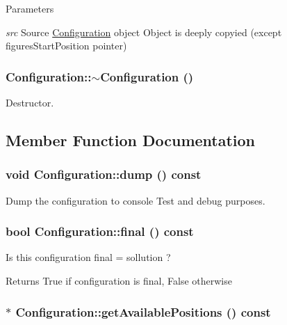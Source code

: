 \begin{DoxyParams}{Parameters}
\item[{\em src}]Source \hyperlink{class_configuration}{Configuration} object Object is deeply copyied (except figuresStartPosition pointer) \end{DoxyParams}
\hypertarget{class_configuration_a0dd0fa189e239f4c9a036303f641441e}{
\subsubsection[{$\sim$Configuration}]{\setlength{\rightskip}{0pt plus 5cm}Configuration::$\sim$Configuration ()}}
\label{class_configuration_a0dd0fa189e239f4c9a036303f641441e}


Destructor. 



\subsection{Member Function Documentation}
\hypertarget{class_configuration_a154b6bf5556ec7e5953652171876dca4}{
\subsubsection[{dump}]{\setlength{\rightskip}{0pt plus 5cm}void Configuration::dump () const}}
\label{class_configuration_a154b6bf5556ec7e5953652171876dca4}


Dump the configuration to console Test and debug purposes. 

\hypertarget{class_configuration_ae2ed3d89437a75e3aee87f43dbdc4a2c}{
\subsubsection[{final}]{\setlength{\rightskip}{0pt plus 5cm}bool Configuration::final () const}}
\label{class_configuration_ae2ed3d89437a75e3aee87f43dbdc4a2c}


Is this configuration final = sollution ? 

\begin{DoxyReturn}{Returns}
True if configuration is final, False otherwise 
\end{DoxyReturn}
\hypertarget{class_configuration_aea495abb2084891fef34c972b586609a}{
\subsubsection[{getAvailablePositions}]{ $\ast$ Configuration::getAvailablePositions () const}}
\label{class_configuration_aea495abb2084891fef34c972b586609a}


